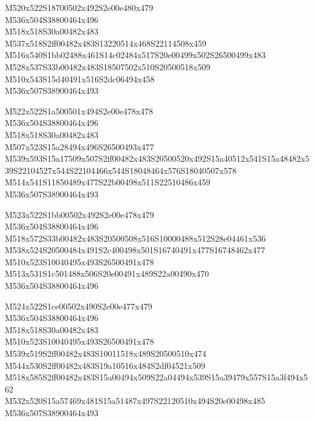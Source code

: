 \documentclass{article}
\begin{document}
\begin{multicols}{5}
\begin{center}

M520x522S18700502x492S2e00e480x479 %
\\M536x504S38800464x496 %
\\M518x518S30a00482x483 %
\\M537x518S2ff00482x483S13220514x468S22114508x459 %
\\M516x540S1bb02488x461S14c02484x517S20e00499x502S26500499x483 %
\\M528x537S33b00482x483S18507502x510S20500518x509 %
\\M510x543S15d40491x516S2dc06494x458 %
\\M536x507S38900464x493 %
\vfil
\columnbreak

M522x522S1a500501x494S2e00e478x478 %
\\M536x504S38800464x496 %
\\M518x518S30a00482x483 %
\\M507x523S15a28494x496S26500493x477 %
\\M539x593S15a17509x507S2ff00482x483S20500520x492S15a40512x541S15a48482x539S22104527x544S22104466x544S18048464x576S18040507x578 %
\\M514x541S11850489x477S22b00498x511S22510486x459 %
\\M536x507S38900464x493 %
\vfil
\columnbreak

M523x522S1bb00502x492S2e00e478x479 %
\\M536x504S38800464x496 %
\\M518x572S33b00482x483S20500508x516S10000488x512S28e04461x536 %
\\M538x524S20500484x491S2c400498x501S16740491x477S16748462x477 %
\\M510x523S10040495x493S26500491x478 %
\\M513x531S1c501488x506S20e00491x489S22a00490x470 %
\\M536x504S38800464x496 %
\vfil
\columnbreak

M524x522S1ce00502x490S2e00e477x479 %
\\M536x504S38800464x496 %
\\M518x518S30a00482x483 %
\\M510x523S10040495x493S26500491x478 %
\\M539x519S2ff00482x483S10011518x489S20500510x474 %
\\M544x530S2ff00482x483S19a10516x484S2df04521x509 %
\\M518x585S2ff00482x483S15a00494x509S22a04494x539S15a39479x557S15a3f494x562 %
\\M532x520S15a57469x481S15a51487x497S22120510x494S20e00498x485 %
\\M536x507S38900464x493 %
\vfil
\columnbreak


\end{center}
\end{multicols}
\end{document}

